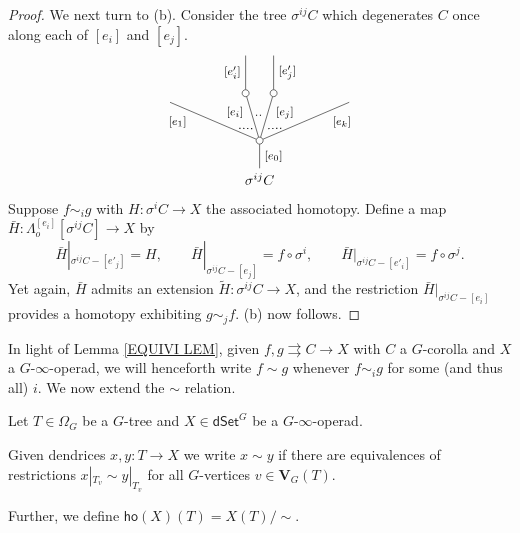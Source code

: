 \documentclass[a4paper,10pt
,draft
]{article}%
\renewcommand{\1}{\eta}%
\begin{document}
\begin{proof}
We next turn to (b). Consider the tree $\sigma^{ij} C$ which degenerates $C$ once along each of $[e_i]$ and $[e_j]$.
\[
\begin{tikzpicture}
[grow=up,auto,level distance=2.75em,
every node/.style = {font=\footnotesize},
dummy/.style={circle,draw,inner sep=0pt,minimum size=1.75mm}]
	\node at (0,0) [font=\normalsize]{$\sigma^{ij} C$}
		child{node [dummy] {}
			child{
			edge from parent node [swap,near end] {$[e_k]$} node [near start,inner sep=1pt,name=Kn] {}}
			child[level distance=3.4em,sibling distance=2em]{node [dummy] {}
				child[level distance=2.7em]{
				edge from parent node [swap] {$[e'_j]$}
}
			edge from parent node [very near end,swap] {$[e_j]$}
node [near start,inner sep=1pt,name=Kone,swap] {}
node [inner sep=1pt,name=Kn2] {}}
			child[level distance=3.4em,sibling distance=2em]{node [dummy] {}
				child[level distance=2.7em]{
				edge from parent node {$[e'_i]$}
}
			edge from parent node [very near end] {$[e_i]$}
node [inner sep=1pt,name=Kone2,swap] {}
node [near start,inner sep=1pt,name=Kone1] {}}
			child{
			edge from parent node [near end] {$[e_1]$}
node [swap] {}
node [near start,inner sep=1pt,name=Kn1,swap]{}}
		edge from parent node [swap] {$[e_0]$}
		};
		\draw [dotted,thick] (Kn) -- (Kone) ;
		\draw [dotted,thick] (Kone1) -- (Kn1) ;
		\draw [dotted,thick] (Kone2) -- (Kn2) ;
\end{tikzpicture}
\]
Suppose $f \sim_i g$ with $H \colon \sigma^{i} C \to X$ the associated homotopy.
Define a map 
$\bar{H} \colon \Lambda^{[e_i]}_o[\sigma^{ij} C] \to X$ by
\[
	\bar{H}|_{\sigma^{ij}C - [e'_j]} = H,
		\qquad
	\bar{H}|_{\sigma^{ij}C - [e_j]} = f \circ \sigma^i,
		\qquad
	\bar{H}|_{\sigma^{ij}C - [e'_i]} = f \circ \sigma^j.
\]
Yet again, $\bar{H}$ admits an extension $\widetilde{H} \colon \sigma^{ij}C \to X$, and the restriction $\bar{H}|_{\sigma^{ij}C - [e_i]}$
provides a homotopy exhibiting $g \sim_j f$. (b) now follows.
\end{proof}

In light of Lemma \ref{EQUIVI LEM},
given $f,g \rightrightarrows C \to X$ with 
$C$ a $G$-corolla and $X$ a $G$-$\infty$-operad,
we will henceforth write $f \sim g$ whenever $f \sim_i g$ for some (and thus all) $i$.
We now extend the $\sim$ relation.

\begin{definition}\label{XTENDSIM DEF}
	Let $T \in \Omega_G$ be a $G$-tree
	and $X \in \mathsf{dSet}^G$ be a 
	$G$-$\infty$-operad.
	
	Given dendrices $x,y\colon T \to X$ we write
	$x \sim y$ if there are equivalences of restrictions
	$x|_{T_v} \sim y|_{T_v}$ for all $G$-vertices
	$v \in \boldsymbol{V}_G(T)$.
	
	Further, we define $\mathsf{ho}(X)(T) = X(T)/\sim$.
\end{definition}
\end{document}
